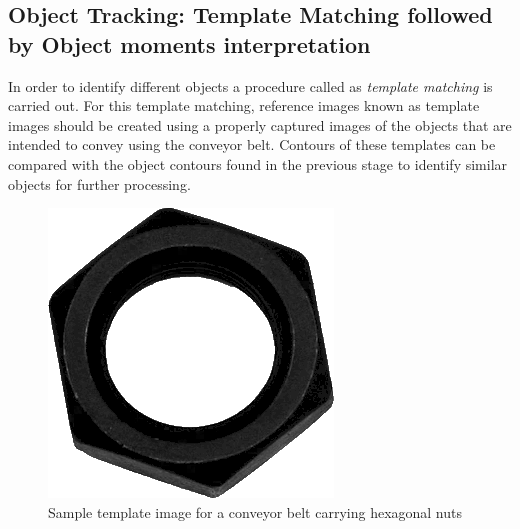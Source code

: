 \documentclass[a4paper,12pt]{book}%
\begin{document}
\subsection{Object Tracking: Template Matching followed by Object moments interpretation}

In order to identify different objects a procedure called as \textit{template matching} is carried out. For this template matching, reference images known as template images should be created using a properly captured images of the objects that are intended to convey using the conveyor belt. Contours of these templates can be compared with the object contours found in the previous stage to identify similar objects for further processing. 

\begin{figure}[H]
	\centering
	\includegraphics[scale=0.45]{figures/template}
	\caption{Sample template image for a conveyor belt carrying hexagonal nuts}
\end{figure}




\end{document}
